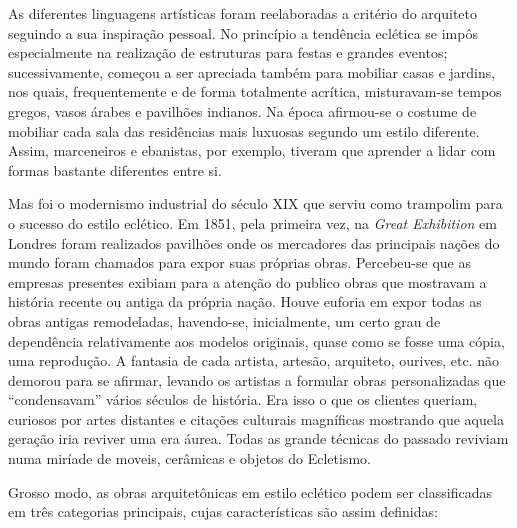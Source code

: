 As diferentes linguagens artísticas foram reelaboradas a critério do arquiteto seguindo a sua inspiração pessoal. No princípio a tendência eclética se impôs especialmente na realização de estruturas para festas e grandes eventos; sucessivamente, começou a ser apreciada também para mobiliar casas e jardins, nos quais, frequentemente e de forma totalmente acrítica, misturavam-se tempos gregos, vasos árabes e pavilhões indianos. Na época afirmou-se o costume de mobiliar cada sala das residências mais luxuosas segundo um estilo diferente. Assim, marceneiros e ebanistas, por exemplo, tiveram que aprender a lidar com formas bastante diferentes entre si. 

Mas foi o modernismo industrial do século XIX que serviu como trampolim para o sucesso do estilo eclético. Em 1851, pela primeira vez, na \textit{Great Exhibition} em Londres foram realizados pavilhões onde os mercadores das principais nações do mundo foram chamados para expor suas próprias obras. Percebeu-se que as empresas presentes exibiam para a atenção do publico obras que mostravam a história recente ou antiga da própria nação. Houve euforia em expor todas as obras antigas remodeladas, havendo-se, inicialmente, um certo grau de dependência relativamente aos modelos originais, quase como se fosse uma cópia, uma reprodução. A fantasia de cada artista, artesão, arquiteto, ourives, etc. não demorou para se afirmar, levando os artistas a formular obras personalizadas que ``condensavam'' vários séculos de história. Era isso o que os clientes queriam, curiosos por artes distantes e citações culturais magníficas mostrando que aquela geração iria reviver uma era áurea. Todas as grande técnicas do passado reviviam numa miríade de moveis, cerâmicas e
objetos do Ecletismo.

Grosso modo, as obras arquitetônicas em estilo eclético podem ser classificadas em três categorias principais, cujas características são assim definidas:

